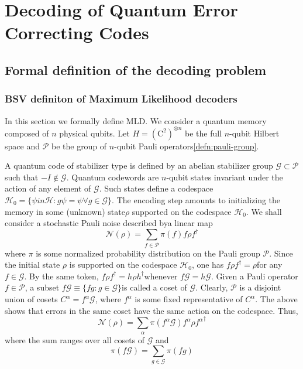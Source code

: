 \chapter{Decoding of Quantum Error Correcting Codes}

\section{Formal definition of the decoding problem}

\subsection{BSV definiton of Maximum Likelihood decoders}
In this section we formally define MLD. We consider a quantum memory composed of \(n\) physical qubits. Let \(H= (\mathrm{C}^{2})^{\otimes n}\) be the full \(n\)-qubit Hilbert space and \(\mathcal{P}\) be the group of \(n\)-qubit Pauli operators\ref{defn:pauli-group}.


A quantum code of stabilizer type is defined by an abelian stabilizer group \(\mathcal{G} \subset \mathcal{P}\) such that \(-I \notin \mathcal{G}\). Quantum codewords are \(n\)-qubit states invariant under the action of any element of \(\mathcal{G}\). Such states define a codespace \(\mathcal{H}_0 = \{ \psi in  \mathcal{H}: g \psi = \psi \forall g \in \mathcal{G}\}\). The encoding step amounts to initializing the memory in some (unknown) state\(\rho\) supported on the codespace \(\mathcal{H}_0\). We shall consider a stochastic Pauli noise described bya linear map
\begin{equation*}
    \mathcal{N}(\rho)  = \sum_{f \in \mathcal{P}} \pi (f) f \rho f^{\dag}
\end{equation*}
where \(\pi\) is some normalized probability distribution on the Pauli group \(\mathcal{P}\).
Since the initial state \(\rho\) is supported on the codespace \(\mathcal{H}_0\), one has \(f \rho f^{\dag} = \rho\)for any \(f \in \mathcal{G}\). By the same token, \(f \rho f^{\dag} = h \rho h^{\dag}\)whenever \(f\mathcal{G} = h\mathcal{G}\). Given a Pauli operator \(f \in \mathcal{P}\), a subset \(f\mathcal{G}\equiv \{fg: g \in \mathcal{G}\}\)is called a coset of \(\mathcal{G}\). Clearly, \(\mathcal{P}\) is a disjoint union of cosets \(C^{\alpha} = f^{\alpha} \mathcal{G}\), where \(f^{\alpha}\) is some fixed representative of \(C^{\alpha}\). The above shows that errors in the same coset have the same action on the codespace. Thus,
\begin{equation*}
    \mathcal{N}(\rho)  = \sum_{\alpha} \pi (f^{\alpha}\mathcal{G}) f^{\alpha} \rho {f^{\alpha}}^{\dag}
\end{equation*}
where the sum ranges over all cosets of \(\mathcal{G}\) and
\begin{equation*}
    \pi(f\mathcal{G}) = \sum_{g \in \mathcal{G}} \pi(fg)
\end{equation*}

